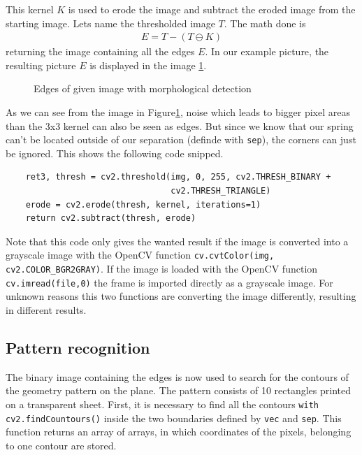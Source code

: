 This kernel $K$ is used to erode the image and subtract the eroded image from the starting image. Lets name the thresholded image $T$. The math done is 
\begin{align*}
E = T-(T\ominus K)
\end{align*}
returning the image containing all the edges $E$. In our example picture, the resulting picture $E$ is displayed in the image \ref{development:edge}.\\
\begin{figure}[ht]
	\centering
	\caption{Edges of given image with morphological detection}
	\label{development:edge}
\end{figure}
As we can see from the image in Figure\ref{development:edge}, noise which leads to bigger pixel areas than the 3x3 kernel can also be seen as edges. But since we know that our spring can't be located outside of our separation (definde with \texttt{sep}), the corners can just be ignored.
This shows the following code snipped.
\begin{lstlisting}
	ret3, thresh = cv2.threshold(img, 0, 255, cv2.THRESH_BINARY +
	                             cv2.THRESH_TRIANGLE)
	erode = cv2.erode(thresh, kernel, iterations=1)
	return cv2.subtract(thresh, erode)
\end{lstlisting} 
Note that this code only gives the wanted result if the image is converted into a grayscale image with the OpenCV function \texttt{cv.cvtColor(img, cv2.COLOR\_BGR2GRAY)}.
If the image is loaded with the OpenCV function \texttt{cv.imread(file,0)} the frame is imported directly as a grayscale image. For unknown reasons this two functions are converting the image differently, resulting in different results.

\subsection{Pattern recognition}
The binary image containing the edges is now used to search for the contours of the geometry pattern on the plane.
The pattern consists of 10 rectangles printed on a transparent sheet.
First, it is necessary to find all the contours \texttt{with cv2.findCountours()} inside the two boundaries defined by \texttt{vec} and \texttt{sep}.
This function returns an array of arrays, in which coordinates of the pixels, belonging to one contour are stored.

